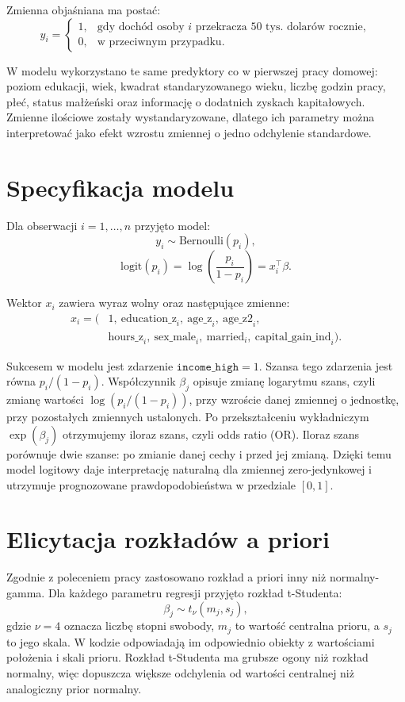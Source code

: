 \documentclass[12pt,a4paper]{article}
\begin{document}
Zmienna objaśniana ma postać:
\[
 y_i =
 \begin{cases}
 1, & \text{gdy dochód osoby } i \text{ przekracza 50 tys. dolarów rocznie},\\
 0, & \text{w przeciwnym przypadku.}
 \end{cases}
\]

W modelu wykorzystano te same predyktory co w pierwszej pracy domowej: poziom
edukacji, wiek, kwadrat standaryzowanego wieku, liczbę godzin pracy, płeć,
status małżeński oraz informację o dodatnich zyskach kapitałowych. Zmienne
ilościowe zostały wystandaryzowane, dlatego ich parametry można interpretować
jako efekt wzrostu zmiennej o jedno odchylenie standardowe.

\section{Specyfikacja modelu}

Dla obserwacji $i=1,\ldots,n$ przyjęto model:
\[
 y_i \sim \mathrm{Bernoulli}(p_i),
\]
\[
 \mathrm{logit}(p_i)
 =
 \log\left(\frac{p_i}{1-p_i}\right)
 =
 x_i^\top \beta.
\]

Wektor $x_i$ zawiera wyraz wolny oraz następujące zmienne:
\[
\begin{aligned}
 x_i = (&1,\ \mathrm{education\_z}_i,\ \mathrm{age\_z}_i,\ \mathrm{age\_z2}_i,\\
       &\mathrm{hours\_z}_i,\ \mathrm{sex\_male}_i,\ \mathrm{married}_i,
       \ \mathrm{capital\_gain\_ind}_i).
\end{aligned}
\]

Sukcesem w modelu jest zdarzenie \(\texttt{income\_high}=1\). Szansa tego
zdarzenia jest równa \(p_i/(1-p_i)\). Współczynnik \(\beta_j\) opisuje zmianę
logarytmu szans, czyli zmianę wartości \(\log(p_i/(1-p_i))\), przy wzroście
danej zmiennej o jednostkę, przy pozostałych zmiennych ustalonych. Po
przekształceniu wykładniczym \(\exp(\beta_j)\) otrzymujemy iloraz szans, czyli
odds ratio (OR). Iloraz szans porównuje dwie szanse: po zmianie danej cechy i
przed jej zmianą. Dzięki temu model logitowy daje interpretację naturalną dla
zmiennej zero-jedynkowej i utrzymuje prognozowane prawdopodobieństwa w
przedziale $[0,1]$.

\section{Elicytacja rozkładów a priori}

Zgodnie z poleceniem pracy zastosowano rozkład a priori inny niż normalny-gamma.
Dla każdego parametru regresji przyjęto rozkład t-Studenta:
\[
 \beta_j \sim t_{\nu}(m_j, s_j),
\]
gdzie \(\nu=4\) oznacza liczbę stopni swobody, \(m_j\) to wartość centralna
prioru, a \(s_j\) to jego skala. W kodzie odpowiadają im odpowiednio obiekty
z wartościami położenia i skali prioru. Rozkład t-Studenta ma grubsze ogony niż
rozkład normalny, więc dopuszcza większe odchylenia od wartości centralnej niż
analogiczny prior normalny.
\end{document}
